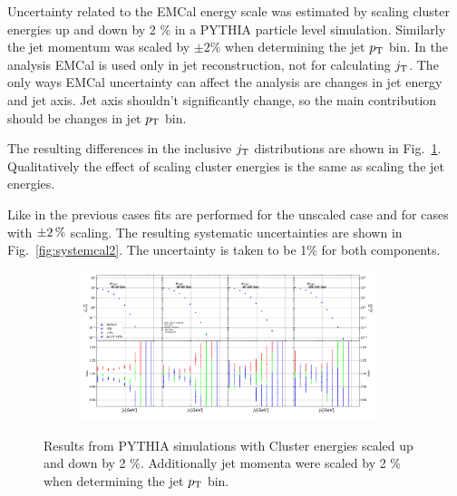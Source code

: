 Uncertainty related to the EMCal energy scale was estimated by scaling cluster energies up and down by 2 \% in a PYTHIA particle level simulation. Similarly the jet momentum was scaled by $\pm 2\%$ when determining the jet $p_{\rm T}$ bin. In the analysis EMCal is used only in jet reconstruction, not for calculating $j_{\rm T}$. The only ways EMCal uncertainty can affect the analysis are changes in jet energy and jet axis. Jet axis shouldn't significantly change, so the main contribution should be changes in jet $p_{\rm T}$ bin.

The resulting differences in the inclusive $j_{\rm T}$ distributions are shown in Fig.~\ref{fig:systemcal}. Qualitatively the effect of scaling cluster energies is the same as scaling the jet energies.

Like in the previous cases fits are performed for the unscaled case and for cases with $\pm \unit[2]{\%}$ scaling. The resulting systematic uncertainties are shown in Fig.~\ref{fig:systemcal2}. The uncertainty is taken to be 1\% for both components.

\begin{figure}
\centering
\begin{subfigure}{0.90\textwidth}
\includegraphics[width=0.95\textwidth]{figures/systematics/HadCorrComparisonJetPt4To8.pdf}
\end{subfigure}
\caption{Results from PYTHIA simulations with Cluster energies scaled up and down by 2 \%. Additionally jet momenta were scaled by 2 \% when determining the jet $p_{\rm T}$ bin.}
\label{fig:systemcal}
\end{figure}

